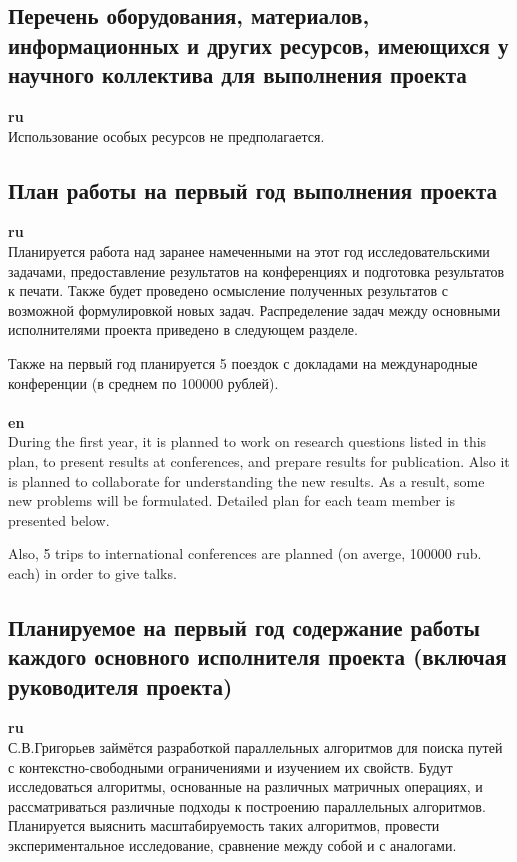\documentclass[12pt]{article}  %
\theoremstyle{remark}
\begin{document}
\subsection{Перечень оборудования, материалов, информационных и других ресурсов, имеющихся у научного коллектива для выполнения проекта}
\textbf{ru}\\
%
Использование особых ресурсов не предполагается.

\subsection{План работы на первый год выполнения проекта}

\textbf{ru}\\
%
Планируется работа над заранее намеченными на этот год исследовательскими задачами, предоставление результатов на конференциях и подготовка результатов к печати.
Также будет проведено осмысление полученных результатов с возможной формулировкой новых задач. Распределение задач между основными исполнителями проекта приведено в следующем разделе.

Также на первый год планируется 5 поездок с докладами на международные конференции (в среднем по 100000 рублей).
\\
\\
\textbf{en}\\
During the first year, it is planned to work on research questions listed in this plan, to present results at conferences, and prepare results for publication. 
Also it is planned to collaborate for understanding the new results. 
As a result, some new problems will be formulated. 
Detailed plan for each team member is presented below.

Also, 5 trips to international conferences are planned (on averge, 100000 rub. each) in order to give talks.



\subsection{Планируемое на первый год содержание работы каждого основного исполнителя проекта (включая руководителя проекта)}

\textbf{ru}\\
%
С.В.Григорьев займётся разработкой параллельных алгоритмов для поиска путей с контекстно-свободными ограничениями и изучением их свойств.
Будут исследоваться алгоритмы, основанные на различных матричных операциях, и рассматриваться различные подходы к построению параллельных алгоритмов.
Планируется выяснить масштабируемость таких алгоритмов, провести экспериментальное исследование, сравнение между собой и с аналогами.
\end{document}
